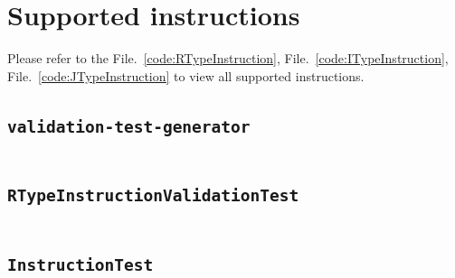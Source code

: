 \documentclass[a4paper]{article}
\begin{document}
\begin{appendix}

\pagestyle{empty}

\section{Supported instructions}

Please refer to the File.~\ref{code:RTypeInstruction},
File.~\ref{code:ITypeInstruction}, File.~\ref{code:JTypeInstruction}
to view all supported instructions.

\begin{landscape}
\section{\texttt{validation-test-generator}}\label{code:validation-test-generator}
\begin{multicols}{2} %
\inputminted[mathescape,
             linenos,
             numbersep=5pt,
             frame=none,
             framesep=2mm,
             fontsize=\footnotesize]{python}{../src/main/test/java/se/filipallberg/dark/mips32decompiler/instruction/validation-test-generator.py}
\end{multicols}
\end{landscape}

%

    \begin{landscape}
    \section{\texttt{RTypeInstructionValidationTest}}\label{code:RTypeInstructionValidationTest}
    \begin{multicols}{2} %
    \inputminted[mathescape,
        linenos,
        numbersep=5pt,
        frame=none,
        framesep=2mm,
        fontsize=\footnotesize]{java}{../src/main/test/java/se/filipallberg/dark/mips32decompiler/instruction/RTypeInstructionValidationTest.java}
    \end{multicols}
    \end{landscape}
    


    \begin{landscape}
    \section{\texttt{InstructionTest}}\label{code:InstructionTest}
    \begin{multicols}{2} %
    \inputminted[mathescape,
        linenos,
        numbersep=5pt,
        frame=none,
        framesep=2mm,
        fontsize=\footnotesize]{java}{../src/main/test/java/se/filipallberg/dark/mips32decompiler/instruction/InstructionTest.java}
    \end{multicols}
    \end{landscape}
    



\end{appendix}
\end{document}
